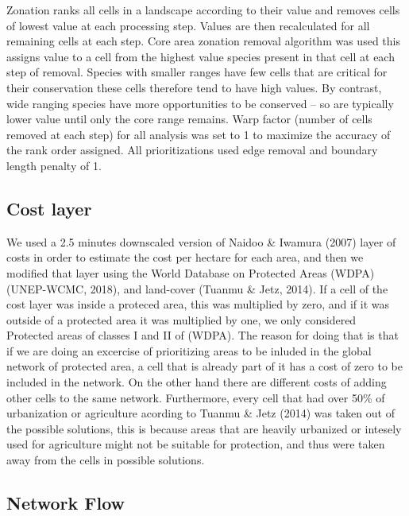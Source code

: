 \documentclass[]{article}
\begin{document}
Zonation ranks all cells in a landscape according to their value and removes cells of lowest value at each processing step. Values are then recalculated for all remaining cells at each step. Core area zonation removal algorithm was used this assigns value to a cell from the highest value species present in that cell at each step of removal. Species with smaller ranges have few cells that are critical for their conservation these cells therefore tend to have high values. By contrast, wide ranging species have more opportunities to be conserved -- so are typically lower value until only the core range remains. Warp factor (number of cells removed at each step) for all analysis was set to 1 to maximize the accuracy of the rank order assigned. All prioritizations used edge removal and boundary length penalty of 1.

\hypertarget{cost-layer}{%
\subsection{Cost layer}\label{cost-layer}}

We used a 2.5 minutes downscaled version of Naidoo \& Iwamura (2007) layer of costs in order to estimate the cost per hectare for each area, and then we modified that layer using the World Database on Protected Areas (WDPA) (UNEP-WCMC, 2018), and land-cover (Tuanmu \& Jetz, 2014). If a cell of the cost layer was inside a proteced area, this was multiplied by zero, and if it was outside of a protected area it was multiplied by one, we only considered Protected areas of classes I and II of (WDPA). The reason for doing that is that if we are doing an excercise of prioritizing areas to be inluded in the global network of protected area, a cell that is already part of it has a cost of zero to be included in the network. On the other hand there are different costs of adding other cells to the same network. Furthermore, every cell that had over 50\% of urbanization or agriculture acording to Tuanmu \& Jetz (2014) was taken out of the possible solutions, this is because areas that are heavily urbanized or intesely used for agriculture might not be suitable for protection, and thus were taken away from the cells in possible solutions.

\hypertarget{network-flow}{%
\subsection{Network Flow}\label{network-flow}}
\end{document}
